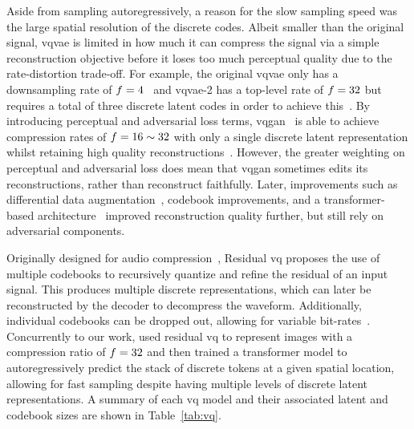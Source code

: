 Aside from sampling autoregressively, a reason for the slow sampling speed was
the large spatial resolution of the discrete codes. Albeit smaller than the
original signal, \gls{vqvae} is limited in how much it can compress the signal
via a simple reconstruction objective before it loses too much perceptual
quality due to the rate-distortion trade-off. For example, the original
\gls{vqvae} only has a downsampling rate of
$f=4$~\cite{oord2017vqvae} and \gls{vqvae}-2 has a top-level rate
of $f=32$ but requires a total of three discrete latent codes in
order to achieve this~\cite{razavi2019generating}. By introducing perceptual and
adversarial loss terms, \gls{vqgan}~\cite{esser2021taming} is able to achieve
compression rates of $f=16 \sim 32$ with only a single discrete
latent representation whilst retaining high quality
reconstructions~\cite{esser2021taming}. However, the greater weighting on
perceptual and adversarial loss does mean that \gls{vqgan} sometimes edits its
reconstructions, rather than reconstruct faithfully. Later, improvements such as
differential data augmentation~\cite{bondtaylor2021unleashing}, codebook
improvements, and a transformer-based architecture~\cite{yu2021vqgan} improved
reconstruction quality further, but still rely on adversarial components.

Originally designed for audio compression~\cite{zeghidour2021soundstream},
Residual \gls{vq} proposes the use of multiple codebooks to recursively quantize
and refine the residual of an input signal. This produces multiple discrete
representations, which can later be reconstructed by the decoder to decompress
the waveform. Additionally, individual codebooks can be dropped out, allowing
for variable bit-rates~\cite{zeghidour2021soundstream}. Concurrently to our
work, \citet{lee2022rqvae} used residual \gls{vq} to represent images with a
compression ratio of $f=32$ and then trained a transformer model
to autoregressively predict the stack of discrete tokens at a given spatial
location, allowing for fast sampling despite having multiple levels of discrete
latent representations\cite{lee2022rqvae}. A summary of each \gls{vq} model and
their associated latent and codebook sizes are shown in Table~\ref{tab:vq}.

